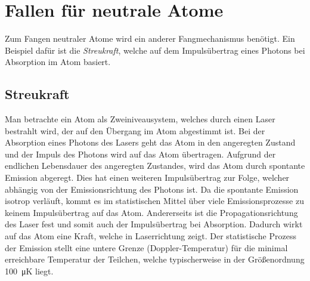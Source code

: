 \documentclass[twocolumn]{revtex4}
\begin{document}
\section{Fallen für neutrale Atome}
Zum Fangen neutraler Atome wird ein anderer Fangmechanismus benötigt.
Ein Beispiel dafür ist die \emph{Streukraft}, welche auf dem Impulsübertrag eines Photons bei Absorption im Atom basiert.

\subsection{Streukraft}
\label{streukraft}
Man betrachte ein Atom als Zweiniveausystem, welches durch einen Laser bestrahlt wird, der auf den Übergang im Atom abgestimmt ist.
Bei der Absorption eines Photons des Lasers geht das Atom in den angeregten Zustand und der Impuls des Photons wird auf das Atom übertragen.
Aufgrund der endlichen Lebensdauer des angeregten Zustandes, wird das Atom durch spontante Emission abgeregt. 
Dies hat einen weiteren Impulsübertrag zur Folge, welcher abhängig von der Emissionsrichtung des Photons ist.
Da die spontante Emission isotrop verläuft, kommt es im statistischen Mittel über viele Emissionsprozesse zu keinem Impulsübertrag auf das Atom.
Andererseits ist die Propagationsrichtung des Laser fest und somit auch der Impulsübertrag bei Absorption.
Dadurch wirkt auf das Atom eine Kraft, welche in Laserrichtung zeigt.
Der statistische Prozess der Emission stellt eine untere Grenze (Doppler-Temperatur) für die minimal erreichbare Temperatur der Teilchen, welche typischerweise in der Größenordnung \SI{100}{\micro\kelvin} liegt.
\end{document}

